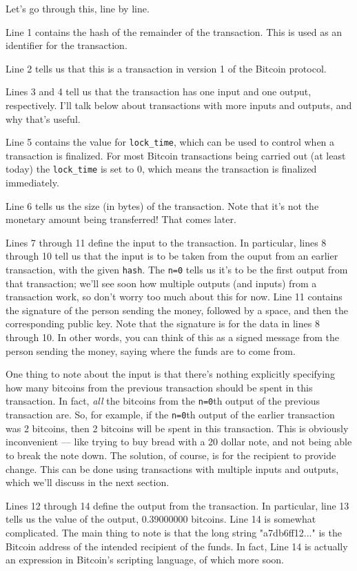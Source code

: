 \documentclass[12pt]{book}
\newcounter{example}[chapter]
\begin{document}
Let's go through this, line by line.

Line 1 contains the hash of the remainder of the transaction.  This is
used as an identifier for the transaction.

Line 2 tells us that this is a transaction in version 1 of the Bitcoin
protocol.

Lines 3 and 4 tell us that the transaction has one input and one
output, respectively.  I'll talk below about transactions with more
inputs and outputs, and why that's useful. 

Line 5 contains the value for \verb|lock_time|, which can be used to
control when a transaction is finalized.  For most Bitcoin
transactions being carried out (at least today) the \verb|lock_time|
is set to 0, which means the transaction is finalized immediately.

Line 6 tells us the size (in bytes) of the transaction.  Note that
it's not the monetary amount being transferred!  That comes later.

Lines 7 through 11 define the input to the transaction.  In
particular, lines 8 through 10 tell us that the input is to be taken
from the ouput from an earlier transaction, with the given
\verb|hash|.  The \verb|n=0| tells us it's to be the first output from
that transaction; we'll see soon how multiple outputs (and inputs)
from a transaction work, so don't worry too much about this for now.
Line 11 contains the signature of the person sending the money,
followed by a space, and then the corresponding public key.  Note that
the signature is for the data in lines 8 through 10.  In other words,
you can think of this as a signed message from the person sending the
money, saying where the funds are to come from.

One thing to note about the input is that there's nothing explicitly
specifying how many bitcoins from the previous transaction should be
spent in this transaction.  In fact, \emph{all} the bitcoins from the
\verb|n=0|th output of the previous transaction are.  So, for example,
if the \verb|n=0|th output of the earlier transaction was 2 bitcoins,
then 2 bitcoins will be spent in this transaction.  This is obviously
inconvenient --- like trying to buy bread with a 20 dollar note, and
not being able to break the note down.  The solution, of course, is
for the recipient to provide change.  This can be done using
transactions with multiple inputs and outputs, which we'll discuss in
the next section.

Lines 12 through 14 define the output from the transaction.  In
particular, line 13 tells us the value of the output, 0.39000000
bitcoins.  Line 14 is somewhat complicated.  The main thing to note is
that the long string "a7db6ff12..." is the Bitcoin address of the
intended recipient of the funds.  In fact, Line 14 is actually an
expression in Bitcoin's scripting language, of which more soon.
\end{document}
